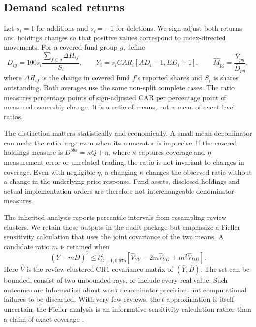 \subsection{Demand scaled returns}

Let $s_i=1$ for additions and $s_i=-1$ for deletions. We sign-adjust both returns and holdings changes so that positive values correspond to index-directed movements. For a covered fund group $g$, define
\begin{equation}
 D_{ig}=100s_i\frac{\sum_{f\in g}\Delta H_{if}}{S_i},\qquad
 Y_i=s_iCAR_i[AD_i-1,ED_i+1],\qquad
 \widehat M_{pg}=\frac{\overline{Y}_{pg}}{\overline{D}_{pg}},
 \label{eq:ratio}
\end{equation}
where $\Delta H_{if}$ is the change in covered fund $f$'s reported shares and $S_i$ is shares outstanding. Both averages use the same non-split complete cases. The ratio measures percentage points of sign-adjusted CAR per percentage point of measured ownership change. It is a ratio of means, not a mean of event-level ratios.

The distinction matters statistically and economically. A small mean denominator can make the ratio large even when its numerator is imprecise. If the covered holdings measure is $D^{obs}=\kappa Q+\eta$, where $\kappa$ captures coverage and $\eta$ measurement error or unrelated trading, the ratio is not invariant to changes in coverage. Even with negligible $\eta$, a changing $\kappa$ changes the observed ratio without a change in the underlying price response. Fund assets, disclosed holdings and actual implementation orders are therefore not interchangeable denominator measures.

The inherited analysis reports percentile intervals from resampling review clusters. We retain those outputs in the audit package but emphasize a Fieller sensitivity calculation that uses the joint covariance of the two means. A candidate ratio $m$ is retained when
\begin{equation}
 (\overline Y-m\overline D)^2\leq
 t_{G-1,0.975}^{2}
 \left[\widehat V_{YY}-2m\widehat V_{YD}+m^2\widehat V_{DD}\right].
 \label{eq:fieller}
\end{equation}
Here $\widehat V$ is the review-clustered CR1 covariance matrix of $(\overline Y,\overline D)$. The set can be bounded, consist of two unbounded rays, or include every real value. Such outcomes are information about weak denominator precision, not computational failures to be discarded. With very few reviews, the $t$ approximation is itself uncertain; the Fieller analysis is an informative sensitivity calculation rather than a claim of exact coverage \citep{fieller1954}.

